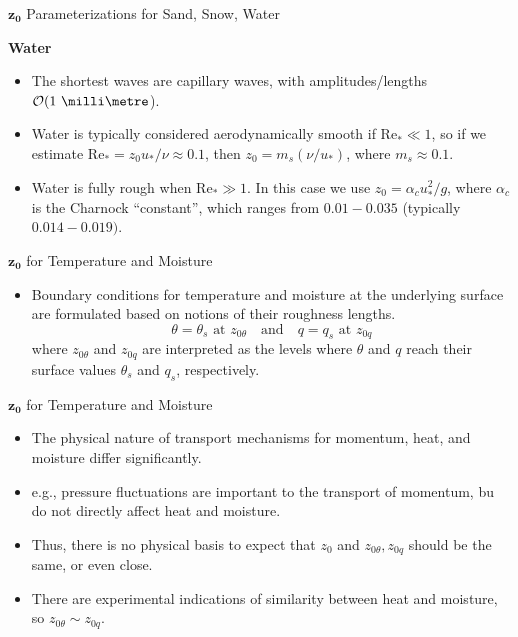 \begin{frame}{$\mathbf{z_0}$ Parameterizations for Sand, Snow, Water}

\textbf{Water}
\begin{itemize}
	\item The shortest waves are capillary waves, with amplitudes/lengths $\mathcal{O}(1\ \milli\metre$).
	\item Water is typically considered aerodynamically smooth if $\mathrm{Re_*} \ll 1$, so if we estimate $\mathrm{Re_*} = z_0 u_* / \nu \approx 0.1$, then $z_0 = m_s\left(\nu/u_*\right)$, where $m_s \approx 0.1$.
	\item Water is fully rough when $\mathrm{Re_*} \gg 1$. In this case we use $z_0 = \alpha_c u_*^2/g$, where $\alpha_c$ is the Charnock ``constant'', which ranges from $0.01-0.035$ (typically $0.014-0.019)$.
\end{itemize}
\end{frame}
\begin{frame}{$\mathbf{z_0}$ for Temperature and Moisture}

\begin{itemize}
	\item Boundary conditions for temperature and moisture at the underlying surface are formulated based on notions of their roughness lengths.
	$$\theta = \theta_s \text{ at } z_{0\theta} \quad \text{and} \quad q = q_s \text{ at } z_{0q}$$
	where $z_{0\theta}$ and $z_{0q}$ are interpreted as the levels where $\theta$ and $q$ reach their surface values $\theta_s$ and $q_s$, respectively.
\end{itemize}
\end{frame}
\begin{frame}{$\mathbf{z_0}$ for Temperature and Moisture}

\begin{itemize}
	\item The physical nature of transport mechanisms for momentum, heat, and moisture differ significantly.
	\item e.g., pressure fluctuations are important to the transport of momentum, bu do not directly affect heat and moisture.
	\item Thus, there is no physical basis to expect that $z_0$ and $z_{0\theta},z_{0q}$ should be the same, or even close.
	\item There are experimental indications of similarity between heat and moisture, so $z_{0\theta} \sim z_{0q}$.
\end{itemize}
\end{frame}
